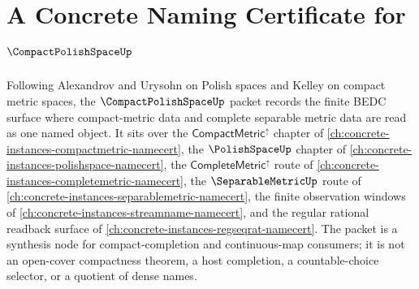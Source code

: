 \chapter{A Concrete Naming Certificate for $\CompactPolishSpaceUp$}
\label{ch:concrete-instances-compact-polish-space-namecert}

Following Alexandrov and Urysohn on Polish spaces and Kelley on compact metric spaces, the $\CompactPolishSpaceUp$ packet records the finite BEDC surface where compact-metric data and complete separable metric data are read as one named object. It sits over the $\mathsf{CompactMetric}^{\uparrow}$ chapter of \autoref{ch:concrete-instances-compactmetric-namecert}, the $\PolishSpaceUp$ chapter of \autoref{ch:concrete-instances-polishspace-namecert}, the $\mathsf{CompleteMetric}^{\uparrow}$ route of \autoref{ch:concrete-instances-completemetric-namecert}, the $\SeparableMetricUp$ route of \autoref{ch:concrete-instances-separablemetric-namecert}, the finite observation windows of \autoref{ch:concrete-instances-streamname-namecert}, and the regular rational readback surface of \autoref{ch:concrete-instances-regseqrat-namecert}. The packet is a synthesis node for compact-completion and continuous-map consumers; it is not an open-cover compactness theorem, a host completion, a countable-choice selector, or a quotient of dense names.

